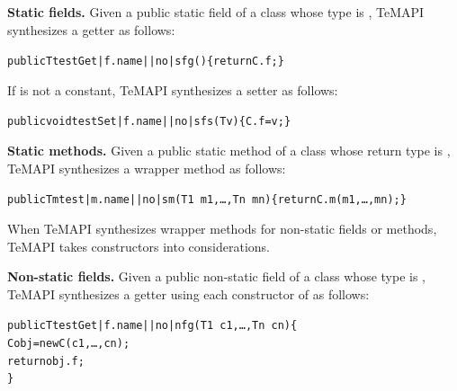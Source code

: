 \textbf{Static fields.} Given a public static field  of a class  whose type is , TeMAPI synthesizes a getter as follows:

\begin{CodeOut}%
\begin{alltt}
 public T testGet|f.name||no|sfg()\{ return C.f; \}
\end{alltt}
\end{CodeOut}%

If  is not a constant, TeMAPI synthesizes a setter as follows:

\begin{CodeOut}%
\begin{alltt}
 public void testSet|f.name||no|sfs(T v)\{ C.f = v; \}
\end{alltt}
\end{CodeOut}%

\textbf{Static methods.} Given a public static method  of a class  whose return type is , TeMAPI synthesizes a wrapper method as follows:

\begin{CodeOut}%
\begin{alltt}
 public Tm test|m.name||no|sm(T1\ m1,\ldots, Tn\ mn)\{ return C.m(m1,\ldots, mn); \}
\end{alltt}
\end{CodeOut}%

When TeMAPI synthesizes wrapper methods for non-static fields or methods, TeMAPI takes constructors into considerations.

\textbf{Non-static fields.} Given a public non-static field  of a class  whose type is , TeMAPI synthesizes a getter using each constructor  of  as follows:

\begin{CodeOut}%
\begin{alltt}
 public T testGet|f.name||no|nfg(T1\ c1,\ldots, Tn\ cn)\{
    C obj = new C(c1,\ldots, cn);
    return obj.f;
 \}
\end{alltt}
\end{CodeOut}%

